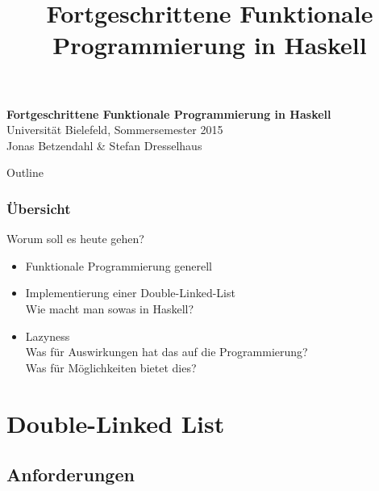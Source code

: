 \documentclass{beamer}
\title{Fortgeschrittene Funktionale Programmierung in Haskell}
\begin{document}
  

  \begin{frame}
  \begin{center}
    \huge\textbf{Fortgeschrittene Funktionale Programmierung in Haskell}\\ \bigskip
    \LARGE Universität Bielefeld, Sommersemester 2015\\ \bigskip
    \large Jonas Betzendahl \& Stefan Dresselhaus
    \end{center}
  \end{frame}

\begin{frame}[allowframebreaks]{Outline}
\frametitle{Übersicht}
\tableofcontents[hideallsubsections]
\end{frame}

\begin{frame}
Worum soll es heute gehen?
\begin{itemize}
 \item Funktionale Programmierung generell
 \pause
 \item Implementierung einer Double-Linked-List\\
       Wie macht man sowas in Haskell?
 \pause
 \item Lazyness\\
       Was für Auswirkungen hat das auf die Programmierung?\\
       Was für Möglichkeiten bietet dies?
\end{itemize}

\end{frame}


\section{Double-Linked List}

\subsection{Anforderungen}
\end{document}
